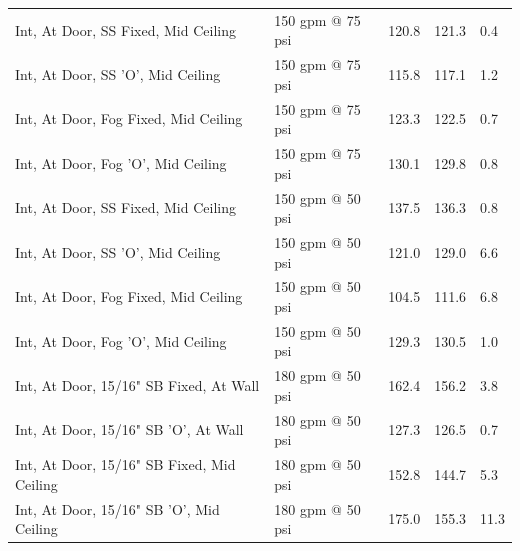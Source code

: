 \documentclass[12pt,oneside]{book}
\begin{document}
\begin{table}[!ht]
\begin{tabular}{lllll}
Int, At Door, SS Fixed, Mid Ceiling                   & 150 gpm @ 75 psi               & 120.8                             & 121.3                              & 0.4                    \\
Int, At Door, SS 'O', Mid Ceiling                     & 150 gpm @ 75 psi               & 115.8                             & 117.1                              & 1.2                    \\
Int, At Door, Fog Fixed, Mid Ceiling                  & 150 gpm @ 75 psi               & 123.3                             & 122.5                              & 0.7                    \\
Int, At Door, Fog 'O', Mid Ceiling                    & 150 gpm @ 75 psi               & 130.1                             & 129.8                              & 0.8                    \\
Int, At Door, SS Fixed, Mid Ceiling                   & 150 gpm @ 50 psi               & 137.5                             & 136.3                              & 0.8                    \\
Int, At Door, SS 'O', Mid Ceiling                     & 150 gpm @ 50 psi               & 121.0                             & 129.0                              & 6.6                    \\
Int, At Door, Fog Fixed, Mid Ceiling                  & 150 gpm @ 50 psi               & 104.5                             & 111.6                              & 6.8                    \\
Int, At Door, Fog 'O', Mid Ceiling                    & 150 gpm @ 50 psi               & 129.3                             & 130.5                              & 1.0                    \\
Int, At Door, 15/16" SB Fixed, At Wall                & 180 gpm @ 50 psi               & 162.4                             & 156.2                              & 3.8                    \\
Int, At Door, 15/16" SB 'O', At Wall                  & 180 gpm @ 50 psi               & 127.3                             & 126.5                              & 0.7                    \\
Int, At Door, 15/16" SB Fixed, Mid Ceiling            & 180 gpm @ 50 psi               & 152.8                             & 144.7                              & 5.3                    \\
Int, At Door, 15/16" SB 'O', Mid Ceiling              & 180 gpm @ 50 psi               & 175.0                             & 155.3                              & 11.3                   \\

\end{tabular}
\end{table}
\end{document}
